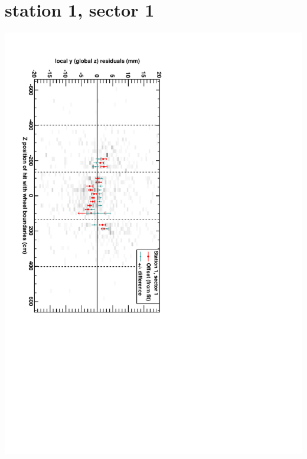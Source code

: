 \documentclass[compress]{beamer}
\begin{document}
\section*{station 1, sector 1}
\begin{frame} \vfill \mbox{\hspace{-1 cm}\includegraphics[height=1.2\linewidth, angle=90]{DTzVsZ_st1_sr01.pdf}} \end{frame}
\end{document}
